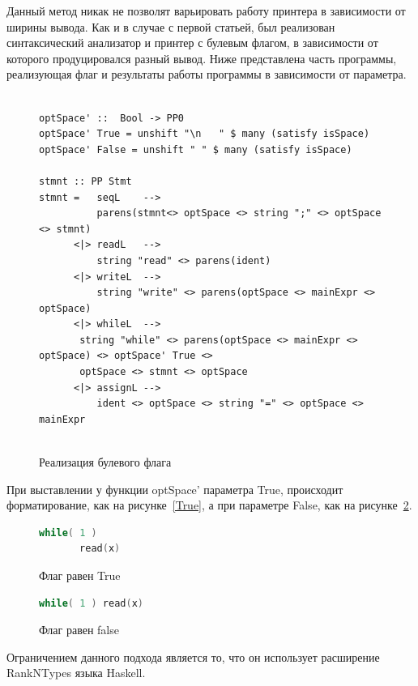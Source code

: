 \documentclass{matmex-diploma-custom}
\begin{document}
Данный метод никак не позволят варьировать работу принтера в зависимости от ширины вывода. Как и в случае с первой статьей, был реализован синтаксический анализатор и принтер с булевым флагом, в зависимости от которого продуцировался разный вывод. Ниже представлена часть программы, реализующая флаг и результаты работы программы в зависимости от параметра.

\begin{figure}[ht]
\centering
\begin{verbatim}

optSpace' ::  Bool -> PP0
optSpace' True = unshift "\n   " $ many (satisfy isSpace)
optSpace' False = unshift " " $ many (satisfy isSpace)

stmnt :: PP Stmt
stmnt =   seqL    -->
          parens(stmnt<> optSpace <> string ";" <> optSpace <> stmnt)
      <|> readL   -->
          string "read" <> parens(ident)
      <|> writeL  -->
          string "write" <> parens(optSpace <> mainExpr <> optSpace)
      <|> whileL  -->
       string "while" <> parens(optSpace <> mainExpr <> optSpace) <> optSpace' True <> 
       optSpace <> stmnt <> optSpace 
      <|> assignL --> 
          ident <> optSpace <> string "=" <> optSpace <> mainExpr  
          

\end{verbatim}
\caption{Реализация булевого флага}
\label{БулФлаг2}
\end{figure}

При выставлении у функции optSpace' параметра True, происходит форматирование, как на рисунке~\ref{True}, а при параметре False, как на рисунке~\ref{False}.

\begin{figure}[h]
  \centering
  \begin{minipage}[h]{0.4\textwidth}
    \begin{lstlisting}[language = C]
    while( 1 )
       read(x)
    \end{lstlisting}
    \caption{Флаг равен True}
    \label{True}
  \end{minipage}
  \hfill
  \begin{minipage}[h]{0.4\textwidth}
    \begin{lstlisting}[language = C]
    while( 1 ) read(x)
    \end{lstlisting}
    \caption{Флаг равен false}
    \label{False}
  \end{minipage}
\end{figure}

Ограничением данного подхода является то, что он использует расширение RankNTypes языка Haskell.
\end{document}
